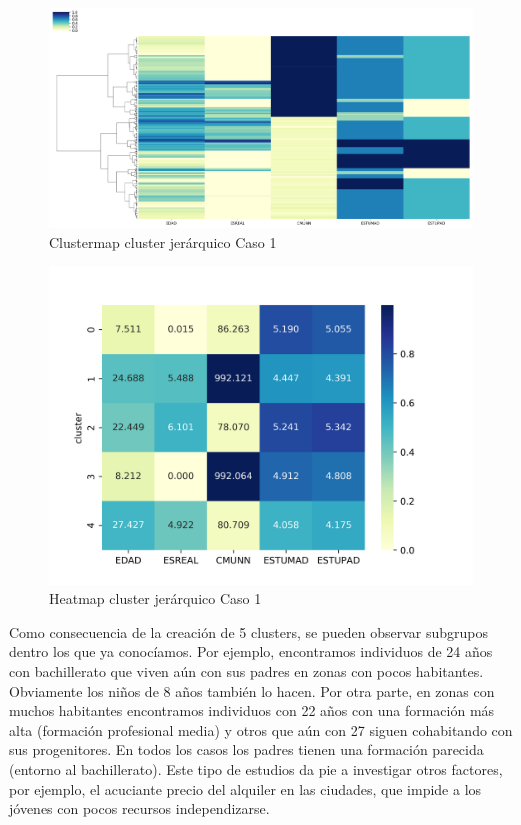 \begin{figure}[H] %
	\centering
	\includegraphics[scale=0.4]{clustermap1.png}  %
	\caption{Clustermap cluster jerárquico Caso 1} 
	\label{fig:clustermap-caso1}
\end{figure}

\begin{figure}[H] %
	\centering
	\includegraphics[scale=0.7]{heatmap-jerarquico1.png}  %
	\caption{Heatmap cluster jerárquico Caso 1} 
	\label{fig:heatmapj-caso1}
\end{figure}

Como consecuencia de la creación de 5 clusters, se pueden observar subgrupos dentro los que ya conocíamos. Por ejemplo, encontramos individuos de 24 años con bachillerato que viven aún con sus padres en zonas con pocos habitantes. Obviamente los niños de 8 años también lo hacen. Por otra parte, en zonas con muchos habitantes encontramos individuos con 22 años con una formación más alta (formación profesional media) y otros que aún con 27 siguen cohabitando con sus progenitores. En todos los casos los padres tienen una formación parecida (entorno al bachillerato). Este tipo de estudios da pie a investigar otros factores, por ejemplo, el acuciante precio del alquiler en las ciudades, que impide a los jóvenes con pocos recursos independizarse.

